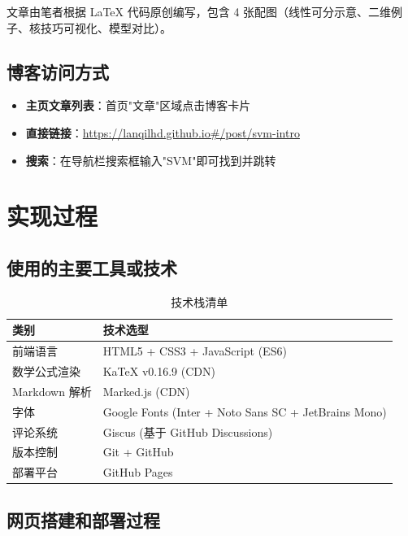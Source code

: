 \documentclass[12pt, a4paper]{article}
\begin{document}
文章由笔者根据 LaTeX 代码原创编写，包含 4 张配图（线性可分示意、二维例子、核技巧可视化、模型对比）。

\subsection{博客访问方式}
\begin{itemize}
    \item \textbf{主页文章列表}：首页"文章"区域点击博客卡片
    \item \textbf{直接链接}：\href{https://lanqilhd.github.io\#/post/svm-intro}{https://lanqilhd.github.io\#/post/svm-intro}
    \item \textbf{搜索}：在导航栏搜索框输入"SVM"即可找到并跳转
\end{itemize}

\section{实现过程}

\subsection{使用的主要工具或技术}

\begin{table}[H]
\centering
\caption{技术栈清单}
\begin{tabular}{ll}
\toprule
\textbf{类别} & \textbf{技术选型} \\
\midrule
前端语言 & HTML5 + CSS3 + JavaScript (ES6) \\
数学公式渲染 & KaTeX v0.16.9 (CDN) \\
Markdown 解析 & Marked.js (CDN) \\
字体 & Google Fonts (Inter + Noto Sans SC + JetBrains Mono) \\
评论系统 & Giscus (基于 GitHub Discussions) \\
版本控制 & Git + GitHub \\
部署平台 & GitHub Pages \\
\bottomrule
\end{tabular}
\end{table}

\subsection{网页搭建和部署过程}
\end{document}
